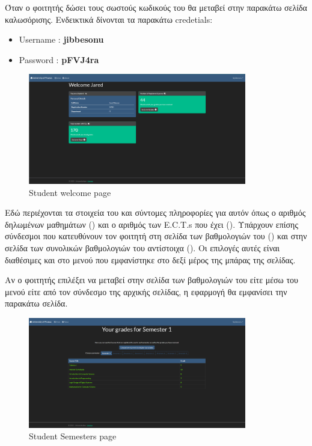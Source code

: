 \documentclass[12pt]{article}
\begin{document}
	Όταν ο φοιτητής δώσει τους σωστούς κωδικούς του θα μεταβεί στην παρακάτω σελίδα καλωσόρισης. Ενδεικτικά δίνονται τα παρακάτω credetials:
	
	\begin{itemize}
		\item Username : \textbf{jibbesonu}
		\item Password : \textbf{pFVJ4ra}
	\end{itemize}



	\begin{figure}[H]
	\centering
	\includegraphics[width=0.85\textwidth]{studentwel.png}
	\caption{Student welcome page}
	\label{fig:emptyView}
	\end{figure}

	Εδώ περιέχονται τα στοιχεία του και σύντομες πληροφορίες για αυτόν όπως ο αριθμός δηλωμένων μαθημάτων () και ο αριθμός των E.C.T.s που έχει (). Υπάρχουν επίσης σύνδεσμοι που κατευθύνουν τον φοιτητή στη σελίδα των βαθμολογιών του () και στην σελίδα των συνολικών βαθμολογιών του αντίστοιχα (). Οι επιλογές αυτές είναι διαθέσιμες και στο μενού που εμφανίστηκε στο δεξί μέρος της μπάρας της σελίδας.
	
	Αν ο φοιτητής επιλέξει να μεταβεί στην σελίδα των βαθμολογιών του είτε μέσω του μενού είτε από τον σύνδεσμο της αρχικής σελίδας, η εφαρμογή θα εμφανίσει την παρακάτω σελίδα.
	
	\begin{figure}[H]
		\centering
		\includegraphics[width=0.85\textwidth]{semesters1.png}
		\caption{Student Semesters page}
		\label{fig:emptyView}
	\end{figure}
	
\end{document}
